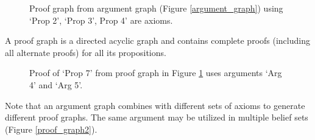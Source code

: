 \documentclass[a4paper]{article}
\begin{document}
\begin{figure}[htbp]
\begin{center}
\caption{Proof graph from argument graph (Figure \ref{argument_graph}) using `Prop 2', `Prop 3', Prop 4' are axioms.}
\label{proof_graph1}
\end{center}
\end{figure}


A proof graph is a directed acyclic graph and contains complete proofs (including all alternate proofs) for all its propositions.

\begin{figure}[htbp]
\begin{center}
\caption{Proof of `Prop 7' from proof graph in Figure \ref{proof_graph1} uses arguments `Arg 4' and `Arg 5'.}
\label{proof_prop7}
\end{center}
\end{figure}

Note that an argument graph combines with different sets of axioms to generate different proof graphs. The same argument may be utilized in multiple belief sets (Figure \ref{proof_graph2}).
\end{document}
